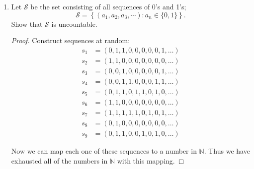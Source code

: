 \documentclass[12pt,letterpaper]{article}
\begin{document}
\begin{enumerate}
\begin{enumerate}
\begin{proof}
\begin{enumerate}
              \item $r < 0, s < 0$
                \begin{align*}
                  g(r) &= g(s) \\
                  \frac{-r + 1}{2} &= \frac{-s + 1}{2} \\
                  -r + 1 &= -s + 1 \\
                  -r &= -s \\
                  r &= s
                \end{align*}

            \end{enumerate}

            So $g$ is 1-1.
            And since $g$ is 1-1, we can construct a mapping
            $f \circ g : \mathbb{Q} \rightarrow \mathbb{Q}^+ \rightarrow \mathbb{N}$.

            So $\mathbb{Q}$ is countable.
          \end{proof}
      \end{enumerate}

    \item Let $\mathcal{S}$ be the set consisting of all sequences of 0's and 1's;
      \[\mathcal{S} = \left\{(a_1, a_2, a_3, \cdots) : a_n \in \{0, 1\}\right\}.\]
      Show that $\mathcal{S}$ is uncountable.

      \begin{proof}
        Construct sequences at random:
        \begin{align*}
          s_1 &= (0, 1, 1, 0, 0, 0, 0, 0, 1, \dots) \\
          s_2 &= (1, 1, 0, 0, 0, 0, 0, 0, 0, \dots) \\
          s_3 &= (0, 0, 1, 0, 0, 0, 0, 0, 1, \dots) \\
          s_4 &= (0, 0, 1, 1, 0, 0, 0, 1, 1, \dots) \\
          s_5 &= (0, 1, 1, 0, 1, 1, 0, 1, 0, \dots) \\
          s_6 &= (1, 1, 0, 0, 0, 0, 0, 0, 0, \dots) \\
          s_7 &= (1, 1, 1, 1, 1, 0, 1, 0, 1, \dots) \\
          s_8 &= (0, 1, 0, 0, 0, 0, 0, 0, 0, \dots) \\
          s_9 &= (0, 1, 1, 0, 0, 1, 0, 1, 0, \dots)
        \end{align*}

        Now we can map each one of these sequences to a number in $\mathbb{N}$.
        Thus we have exhausted all of the numbers in $\mathbb{N}$ with this mapping.


\end{proof}
\end{enumerate}
\end{document}
